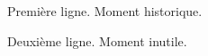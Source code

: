 \documentclass[a4paper,12pt]{report}
\begin{document}



Première ligne. Moment historique.

Deuxième ligne. Moment inutile.



\end{document}
